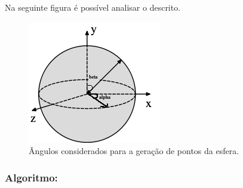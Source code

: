 \documentclass[a4paper]{article}
\begin{document}
Na seguinte figura é possível analisar o descrito.

\begin{figure}[H]
\centering
\includegraphics[scale=1.2]{sphere_angles.png}
\caption{Ângulos considerados para a geração de pontos da esfera.}
\label{img:sphere_angles}
\end{figure}

\subsubsection{Algoritmo:}
\end{document}
